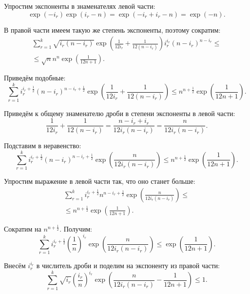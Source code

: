 \documentclass{book}
\begin{document}
Упростим экспоненты в знаменателях левой части:
$$ \exp \left( - i_r \right) \exp \left( i_r - n \right) =
\exp \left( - i_r + i_r - n \right) =
\exp \left( -n \right).$$

В правой части имеем такую же степень экспоненты, поэтому сократим:
\begin{equation*}
\begin{split}
\sum \limits_{r=1}^k \sqrt{i_r \left( n-i_r \right) }
\exp \left( \frac{1}{12 i_r} + \frac{1}{12 \left( n-i_r \right) } \right) i_r^{i_r} \left( n-i_r \right)^{n-i_r} \leq \\
\leq \sqrt{n} n^n \exp \left( \frac{1}{12 n+1} \right).
\end{split}
\end{equation*}

Приведём подобные:
$$ \sum \limits_{r=1}^k i_r^{i_r + \frac{1}{2} } \left( n-i_r \right)^{n - i_r + \frac{1}{2} }
\exp \left( \frac{1}{12 i_r} + \frac{1}{12 \left( n-i_r \right) } \right) \leq
n^{n + \frac{1}{2} } \exp \left( \frac{1}{12 n+1} \right). $$

Приведём к общему знаменателю дроби в степени экспоненты в левой части:
$$ \frac{1}{12 i_r} + \frac{1}{12 \left( n-i_r \right) } =
\frac{n - i_r + i_r}{12 i_r \left( n-i_r \right) } =
\frac{n}{12 i_r \left( n-i_r \right) }. $$

Подставим в неравенство:
$$ \sum \limits_{r=1}^k i_r^{i_r + \frac{1}{2} } \left( n-i_r \right)^{n - i_r + \frac{1}{2} }
\exp \left( \frac{n}{12 i_r \left( n-i_r \right) } \right) \leq 
n^{n + \frac{1}{2} } \exp \left( \frac{1}{12 n+1} \right). $$

Упростим выражение в левой части так, что оно станет больше:
\begin{equation*}
\begin{split}
\sum \limits_{r=1}^k i_r^{i_r + \frac{1}{2} } n^{n - i_r + \frac{1}{2} }
\exp \left( \frac{n}{12 i_r \left( n-i_r \right) } \right) \leq \\
\leq n^{n + \frac{1}{2} } \exp \left( \frac{1}{12 n+1} \right).
\end{split}
\end{equation*}

Сократим на $ n^{n + \frac{1}{2} } $.
Получим:
$$ \sum \limits_{r=1}^k i_r^{i_r + \frac{1}{2} } \left( \frac{1}{n} \right)^{i_r}
\exp \left( \frac{n}{12 i_r \left( n-i_r \right) } \right) \leq
\exp \left( \frac{1}{12 n+1} \right). $$

Внесём $ i_r^{i_r} $ в числитель дроби и поделим на экспоненту из правой части:
$$ \sum \limits_{r=1}^k \sqrt{i_r} \left( \frac{i_r}{n} \right)^{i_r}
\exp \left( \frac{n}{12 i_r \left( n-i_r\right) } - \frac{1}{12 n + 1} \right) \leq 1. $$
\end{document}
